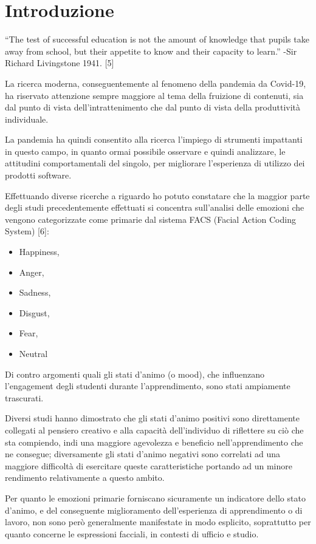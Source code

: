 \chapter{Introduzione}

“The test of successful education is not the amount of knowledge that pupils take away from school, but their appetite to know and their capacity to learn.” 
-Sir Richard Livingstone 1941. [5]

La ricerca moderna, conseguentemente al fenomeno della pandemia da Covid-19, ha riservato attenzione sempre maggiore al tema della fruizione di contenuti, sia dal punto di vista dell’intrattenimento che dal punto di vista della produttività individuale.

La pandemia ha quindi consentito alla ricerca l’impiego di strumenti impattanti in questo campo, in quanto ormai possibile osservare e quindi analizzare, le attitudini comportamentali del singolo, per migliorare l’esperienza di utilizzo dei prodotti software.

Effettuando diverse ricerche a riguardo ho potuto constatare che la maggior parte degli studi precedentemente effettuati si concentra sull’analisi delle emozioni che vengono categorizzate come primarie dal sistema FACS (Facial Action Coding System) [6]:
\begin{itemize}
    \item Happiness,
    \item Anger,
    \item Sadness,
    \item Disgust,
    \item Fear,
    \item Neutral
\end{itemize}

Di contro argomenti quali gli stati d’animo (o mood), che influenzano l’engagement degli studenti durante l’apprendimento, sono stati ampiamente trascurati.

Diversi studi hanno dimostrato che gli stati d’animo positivi sono direttamente collegati al pensiero creativo e alla capacità dell’individuo di riflettere su ciò che sta compiendo, indi una maggiore agevolezza e beneficio nell’apprendimento che ne consegue; diversamente gli stati d’animo negativi sono correlati ad una maggiore difficoltà di esercitare queste caratteristiche portando ad un minore rendimento relativamente a questo ambito.

Per quanto le emozioni primarie forniscano sicuramente un indicatore dello stato d’animo, e del conseguente miglioramento dell’esperienza di apprendimento o di lavoro, non sono però generalmente manifestate in modo esplicito, soprattutto per quanto concerne le espressioni facciali, in contesti di ufficio e studio.

